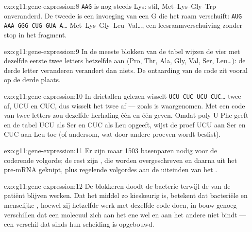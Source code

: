 \begin{solution}{exo:g11:gene-expression:8}
\texttt{AAG} is nog steeds Lys: stil, Met--Lys--Gly--Trp onveranderd. De
tweede is een invoeging van een G die het raam verschuift:
\texttt{AUG AAA GGG CUG GUA A}\dots{}
Met--Lys--Gly--Leu--Val\dots, een leesraamverschuiving zonder stop in het
fragment.
\end{solution}

\begin{solution}{exo:g11:gene-expression:9}
In de meeste blokken van de tabel wijzen de vier  met dezelfde
eerste twee letters hetzelfde  aan (Pro, Thr, Ala, Gly, Val,
Ser, Leu\dots): de derde letter veranderen verandert dan niets. De
ontaarding van de code zit vooral op de derde plaats.
\end{solution}

\begin{solution}{exo:g11:gene-expression:10}
In drietallen gelezen wisselt \texttt{UCU CUC UCU CUC}\dots{} twee 
af, UCU en CUC, dus wisselt het  twee  af --- zoals is
waargenomen. Met een code van twee letters zou dezelfde herhaling één
 en één  geven. Omdat poly-U Phe geeft en de tabel UCU als
Ser en CUC als Leu opgeeft, wijst de proef UCU aan Ser en CUC aan Leu toe
(of andersom, wat door andere proeven wordt beslist).
\end{solution}

\begin{solution}{exo:g11:gene-expression:11}
Er zijn maar 1503 basenparen nodig voor de coderende volgorde; de rest
zijn , die worden overgeschreven en daarna uit het pre-mRNA
geknipt, plus regelende volgordes aan de uiteinden van het .
\end{solution}

\begin{solution}{exo:g11:gene-expression:12}
De  blokkeren doodt de bacterie terwijl de  van de
patiënt blijven werken. Dat het middel zo kieskeurig is, betekent dat
bacteriële en menselijke , hoewel zij hetzelfde werk met
dezelfde code doen, in bouw genoeg verschillen dat een molecuul zich aan
het ene wel en aan het andere niet bindt --- een verschil dat sinds hun
scheiding is opgebouwd.
\end{solution}

